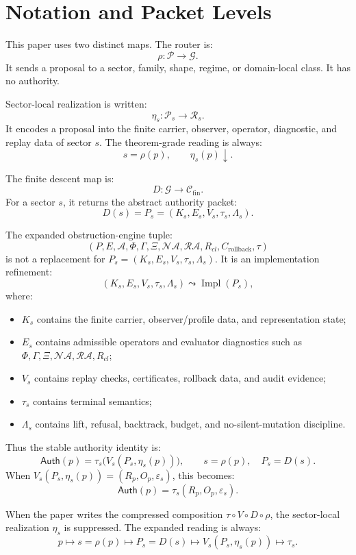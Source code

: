 \documentclass[11pt]{article}
\begin{document}
\section{Notation and Packet Levels}

This paper uses two distinct maps. The router is:
\[
\rho:\mathcal P\to\mathcal G.
\]
It sends a proposal to a sector, family, shape, regime, or domain-local class. It has no authority.

Sector-local realization is written:
\[
\eta_s:\mathcal P_s\to\mathcal R_s.
\]
It encodes a proposal into the finite carrier, observer, operator, diagnostic, and replay data of sector \(s\). The theorem-grade reading is always:
\[
s=\rho(p),
\qquad
\eta_s(p)\downarrow.
\]

The finite descent map is:
\[
D:\mathcal G\to\mathcal C_{\mathrm{fin}}.
\]
For a sector \(s\), it returns the abstract authority packet:
\[
D(s)=P_s=(K_s,E_s,V_s,\tau_s,\Lambda_s).
\]

The expanded obstruction-engine tuple:
\[
(P,E,\mathcal A,\Phi,\Gamma,\Xi,\mathcal{NA},\mathcal{RA},R_{cl},C_{\mathrm{rollback}},\tau)
\]
is not a replacement for \(P_s=(K_s,E_s,V_s,\tau_s,\Lambda_s)\). It is an implementation refinement:
\[
(K_s,E_s,V_s,\tau_s,\Lambda_s) \leadsto \operatorname{Impl}(P_s),
\]
where:
\begin{itemize}
    \item \(K_s\) contains the finite carrier, observer/profile data, and representation state;
    \item \(E_s\) contains admissible operators and evaluator diagnostics such as \(\Phi,\Gamma, \Xi, \mathcal{NA}, \mathcal{RA}, R_{cl}\);
    \item \(V_s\) contains replay checks, certificates, rollback data, and audit evidence;
    \item \(\tau_s\) contains terminal semantics;
    \item \(\Lambda_s\) contains lift, refusal, backtrack, budget, and no-silent-mutation discipline.
\end{itemize}

Thus the stable authority identity is:
\[
\boxed{
\mathsf{Auth}(p)=
\tau_s\bigl(V_s(P_s,\eta_s(p))\bigr),
\qquad
s=\rho(p),
\quad
P_s=D(s).
}
\]
When \(V_s(P_s,\eta_s(p))=(R_p,O_p,\varepsilon_s)\), this becomes:
\[
\boxed{
\mathsf{Auth}(p)=\tau_s(R_p,O_p,\varepsilon_s).
}
\]

When the paper writes the compressed composition \(\tau\circ V\circ D\circ\rho\), the sector-local realization \(\eta_s\) is suppressed. The expanded reading is always:
\[
p\mapsto s=\rho(p) \mapsto P_s=D(s) \mapsto V_s(P_s,\eta_s(p)) \mapsto \tau_s.
\]
\end{document}
